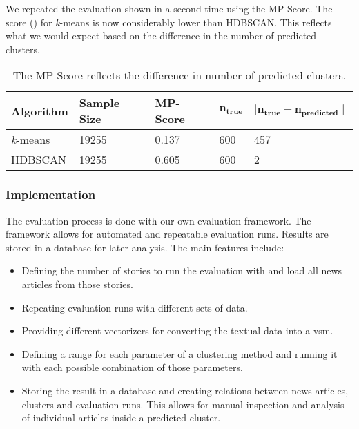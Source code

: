 We repeated the evaluation shown in  a second time using the MP-Score.
The score () for \textit{k}-means is now considerably lower than HDBSCAN.
This reflects what we would expect based on the difference in the number of predicted clusters.

\begin{table}[h]
    \centering
    \begin{tabular}{|l|l|l|l|l|}
    \hline
    \textbf{Algorithm} & \textbf{Sample Size} & \textbf{MP-Score}  & $\mathbf{n_{true}}$ & $\mathbf{ \mid n_{true} - n_{predicted} \mid }$ \\ \hline
    \textit{k}-means & 19255 & 0.137 & 600 & 457 \\ \hline
    HDBSCAN & 19255 & 0.605 & 600 & 2 \\ \hline
    \end{tabular}
    \caption{The MP-Score reflects the difference in number of predicted clusters.}
    \label{tab:avg_predict_kmeans_example}
\end{table}

\subsubsection{Implementation}
\label{subsubsec:4b_implementation}

The evaluation process is done with our own evaluation framework.
The framework allows for automated and repeatable evaluation runs.
Results are stored in a database for later analysis.
The main features include:

\begin{itemize}
    \item Defining the number of stories to run the evaluation with and load all news articles from those stories.
    \item Repeating evaluation runs with different sets of data.
    \item Providing different vectorizers for converting the textual data into a \gls{vsm}.
    \item Defining a range for each parameter of a clustering method
          and running it with each possible combination of those parameters.
    \item Storing the result in a database and creating relations between news articles,
          clusters and evaluation runs.
          This allows for manual inspection and analysis of individual articles inside a predicted cluster.
\end{itemize}

